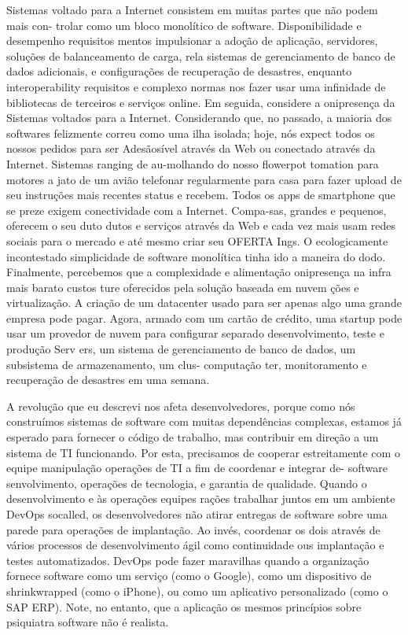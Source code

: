 Sistemas voltado para a Internet consistem em muitas partes que não podem mais con-
trolar como um bloco monolítico de software. Disponibilidade e desempenho requisitos
mentos impulsionar a adoção de aplicação, servidores, soluções de balanceamento de
 carga, rela sistemas de gerenciamento de banco de dados adicionais, e configurações de
recuperação de desastres, enquanto interoperability requisitos e complexo normas
nos fazer usar uma infinidade de bibliotecas de terceiros e serviços online. Em
seguida, considere a onipresença da Sistemas voltados para a Internet. Considerando
que, no passado, a maioria dos softwares felizmente correu como uma ilha isolada;
hoje, nós expect todos os nossos pedidos para ser Adesãosível através da Web ou
conectado através da Internet. Sistemas ranging de au-molhando do nosso flowerpot
tomation para motores a jato de um avião telefonar regularmente para casa para
fazer upload de seu instruções mais recentes status e recebem. Todos os apps de
smartphone que se preze exigem conectividade com a Internet. Compa-sas, grandes e
pequenos, oferecem o seu duto dutos e serviços através da Web e cada vez mais usam
redes sociais para o mercado e até mesmo criar seu OFERTA Ings. O ecologicamente
 incontestado simplicidade de software monolítica tinha ido a maneira do dodo. Finalmente, percebemos que a complexidade e
alimentação onipresença na infra mais barato custos ture oferecidos pela solução
baseada em nuvem ções e virtualização. A criação de um datacenter usado para ser apenas algo
uma grande empresa pode pagar. Agora, armado com um cartão de crédito, uma startup pode
usar um provedor de nuvem para configurar separado desenvolvimento, teste e produção Serv
ers, um sistema de gerenciamento de banco de dados, um subsistema de armazenamento, um clus- computação
ter, monitoramento e recuperação de desastres em uma semana. \cite{6265084}


A revolução que eu descrevi nos afeta desenvolvedores, porque como nós construímos
sistemas de software com muitas dependências complexas, estamos já esperado
para fornecer o código de trabalho, mas contribuir
em direção a um sistema de TI funcionando. Por esta,
precisamos de cooperar estreitamente com o
equipe manipulação operações de TI a fim de
coordenar e integrar de- software
senvolvimento, operações de tecnologia, e
garantia de qualidade.
Quando o desenvolvimento e às operações
equipes rações trabalhar juntos em um ambiente DevOps socalled, os desenvolvedores não
atirar entregas de software sobre uma parede
para operações de implantação. Ao invés,
coordenar os dois através de vários processos de desenvolvimento ágil como continuidade
ous implantação e testes automatizados. DevOps pode fazer maravilhas quando
a organização fornece software
como um serviço (como o Google), como um dispositivo de shrinkwrapped (como o iPhone), ou como
um aplicativo personalizado (como o SAP
ERP). Note, no entanto, que a aplicação
os mesmos princípios sobre psiquiatra software não é realista.\cite{6265084}



